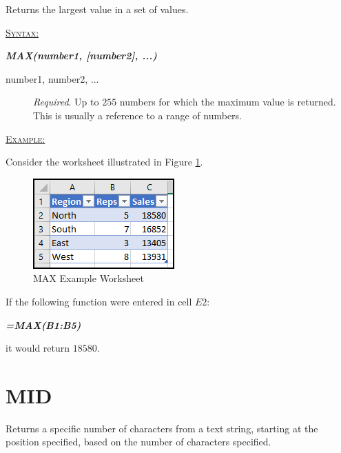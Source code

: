 Returns the largest value in a set of values. 

\begin{addmargin}[1cm]{0cm}
	
	\medskip
	\underline{\textsc{Syntax:}}
	\medskip
	
	{\color{Syntax}
		\noindent\textbf{\textit{MAX(number1, [number2], ...)}}
	}
	
	\begin{description}
		\item[number1, number2, ...] \textit{Required}. Up to $ 255 $ numbers for which the maximum value is returned. This is usually a reference to a range of numbers.
	\end{description}

	\medskip
	\noindent\underline{\textsc{Example:}}
	\medskip
	
	\noindent Consider the worksheet illustrated in Figure \ref{apa:max}.
	
	\begin{figure}[H]
		\centering
		\includegraphics[width=\maxwidth{.45\linewidth}]{gfx/apa_fig01}
		\caption{MAX Example Worksheet}
		\label{apa:max}
	\end{figure}
	
	\noindent If the following function were entered in cell $ E2 $:
	
	{\color{Syntax}
		\textit{\textbf{=MAX(B1:B5)}}
	}
	
	\noindent it would return $ 18580 $.

\end{addmargin}

\section{MID}

Returns a specific number of characters from a text string, starting at the position specified, based on the number of characters specified.

